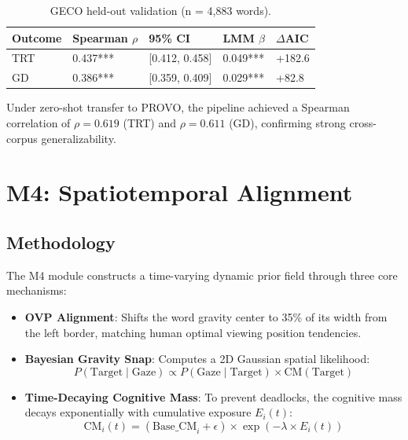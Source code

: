 \documentclass[sigconf]{acmart}
\begin{document}
\begin{table}[h]
\centering
\caption{GECO held-out validation (n = 4,883 words).}
\label{tab:m3_results}
\begin{tabular}{lllll}
\toprule
Outcome & Spearman $\rho$ & 95\% CI & LMM $\beta$ & $\Delta$AIC \\
\midrule
TRT & 0.437*** & [0.412, 0.458] & 0.049*** & +182.6 \\
GD & 0.386*** & [0.359, 0.409] & 0.029*** & +82.8 \\
\bottomrule
\end{tabular}
\end{table}

Under zero-shot transfer to PROVO, the pipeline achieved a Spearman correlation of $\rho = 0.619$ (TRT) and $\rho = 0.611$ (GD), confirming strong cross-corpus generalizability.

\section{M4: Spatiotemporal Alignment}
\subsection{Methodology}
The M4 module constructs a time-varying dynamic prior field through three core mechanisms:
\begin{itemize}
    \item \textbf{OVP Alignment}: Shifts the word gravity center to 35\% of its width from the left border, matching human optimal viewing position tendencies.
    \item \textbf{Bayesian Gravity Snap}: Computes a 2D Gaussian spatial likelihood:
    \begin{equation}
    P(\text{Target} \mid \text{Gaze}) \propto P(\text{Gaze} \mid \text{Target}) \times \text{CM}(\text{Target})
    \end{equation}
    \item \textbf{Time-Decaying Cognitive Mass}: To prevent deadlocks, the cognitive mass decays exponentially with cumulative exposure $E_i(t)$:
    \begin{equation}
    \text{CM}_i(t) = (\text{Base\_CM}_i + \epsilon) \times \exp(-\lambda \times E_i(t))
    \end{equation}
\end{itemize}
\end{document}

